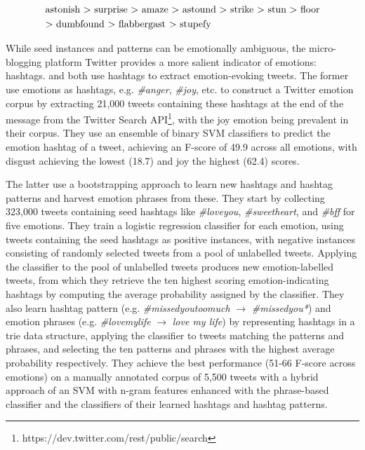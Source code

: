 \begin{align}
\begin{split}\label{ex:emotion_verbs}
&\textnormal{astonish > surprise > amaze > astound > strike > stun > floor}\\
&\textnormal{> dumbfound > flabbergast > stupefy}
\end{split}
\end{align}

While seed instances and patterns can be emotionally ambiguous, the micro-blogging platform Twitter provides a more salient indicator of emotions: hashtags. \citeauthor{twitter_hashtags_nrc} and \citeauthor{twitter_hashtags_bootstrapping} both use hashtags to extract emotion-evoking tweets. The former use emotions as hashtags, e.g. \textit{\#anger}, \textit{\#joy}, etc. to construct a Twitter emotion corpus by extracting 21,000 tweets containing these hashtags at the end of the message from the Twitter Search API\footnote{https://dev.twitter.com/rest/public/search}, with the joy emotion being prevalent in their corpus. They use an ensemble of binary SVM classifiers to predict the emotion hashtag of a tweet, achieving an F-score of 49.9 across all emotions, with disgust achieving the lowest (18.7) and joy the highest (62.4) scores.

The latter use a bootstrapping approach to learn new hashtags and hashtag patterns and harvest emotion phrases from these. They start by collecting 323,000 tweets containing seed hashtags like \textit{\#loveyou}, \textit{\#sweetheart}, and \textit{\#bff} for five emotions. They train a logistic regression classifier for each emotion, using tweets containing the seed hashtags as positive instances, with negative instances consisting of randomly selected tweets from a pool of unlabelled tweets. Applying the classifier to the pool of unlabelled tweets produces new emotion-labelled tweets, from which they retrieve the ten highest scoring emotion-indicating hashtags by computing the average probability assigned by the classifier. They also learn hashtag pattern (e.g. \textit{\#missedyoutoomuch} $\rightarrow$ \textit{\#missedyou*}) and emotion phrases (e.g. \textit{\#lovemylife} $\rightarrow$ \textit{love my life}) by representing hashtags in a trie data structure, applying the classifier to tweets matching the patterns and phrases, and selecting the ten patterns and phrases with the highest average probability respectively. They achieve the best performance (51-66 F-score across emotions) on a manually annotated corpus of 5,500 tweets with a hybrid approach of an SVM with n-gram features enhanced with the phrase-based classifier and the classifiers of their learned hashtags and hashtag patterns.

